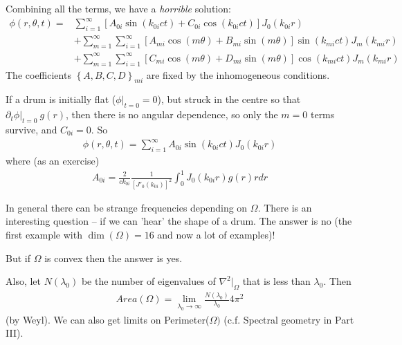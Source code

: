 \documentclass[a4paper]{article}
\begin{document}
Combining all the terms, we have a \emph{horrible} solution:
\begin{equation*}
\begin{aligned}
\phi\left(r,\theta,t\right) = &\sum_{i=1}^\infty \left[A_{0i} \sin \left(k_{0i} ct\right) + C_{0i} \cos\left(k_{0i} ct\right)\right] J_0 \left(k_{0i} r\right) 
\\& +\sum_{m=1}^\infty \sum_{i=1}^\infty \left[A_{mi} \cos\left(m\theta\right) + B_{mi}\sin \left(m\theta\right)\right] \sin\left(k_{mi} ct\right) J_m\left(k_{mi} r\right) 
\\&+\sum_{m=1}^\infty \sum_{i=1}^\infty \left[C_{mi} \cos\left(m\theta\right) + D_{mi} \sin\left(m\theta\right)\right] \cos\left(k_{mi} ct\right) J_m \left(k_{mi} r\right)
\end{aligned}
\end{equation*}
The coefficients $\left\{A,B,C,D\right\}_{mi}$ are fixed by the inhomogeneous conditions.

\begin{eg}
If a drum is initially flat ($\phi|_{t=0} = 0$), but struck in the centre so that $\partial_t\phi|_{t=0} \ g\left(r\right)$, then there is no angular dependence, so only the $m=0$ terms survive, and $C_{0i} = 0$. So
\begin{equation*}
\begin{aligned}
\phi\left(r,\theta,t\right) = \sum_{i=1}^\infty A_{0i} \sin\left(k_{0i} ct\right) J_0 \left(k_{0i} r\right)
\end{aligned}
\end{equation*}
where (as an exercise)
\begin{equation*}
\begin{aligned}
A_{0i} = \frac{2}{ck_{0i}} \frac{1}{\left[J'_0\left(k_{0i}\right)\right]^2} \int_0^1 J_0 \left(k_{0i}r\right) g\left(r\right) r dr
\end{aligned}
\end{equation*}
\end{eg}


In general there can be strange frequencies depending on $\Omega$. There is an interesting question -- if we can 'hear' the shape of a drum. The answer is no (the first example with $\dim\left(\Omega\right) = 16$ and now a lot of examples)!

But if $\Omega$ is convex then the answer is yes.

Also, let $N\left(\lambda_0\right)$ be the number of eigenvalues of $\nabla^2|_\Omega$ that is less than $\lambda_0$. Then
\begin{equation*}
\begin{aligned}
Area\left(\Omega\right) = \lim_{\lambda_0\to\infty} \frac{N\left(\lambda_0\right)}{\lambda_0} 4\pi^2
\end{aligned}
\end{equation*}
(by Weyl). We can also get limits on Perimeter($\Omega)$ (c.f. Spectral geometry in Part III).
\end{document}
